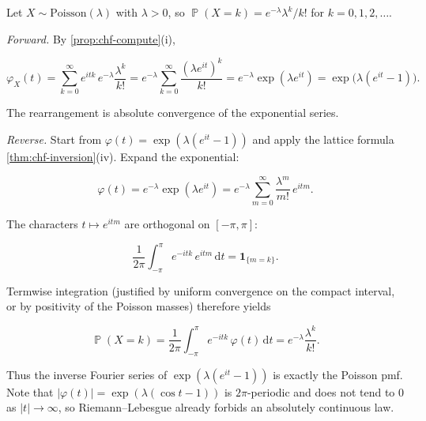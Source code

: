 \documentclass[11pt,a4paper]{article}
\DeclareMathOperator{\Pbb}{\mathbb{P}}
\begin{document}
\begin{example}
\label{ex:chf-poisson}
Let \(X\sim\mathrm{Poisson}(\lambda)\) with \(\lambda>0\), so \(\Pbb(X=k)=e^{-\lambda}\lambda^{k}/k!\) for \(k=0,1,2,\dots\).

\emph{Forward.} By \cref{prop:chf-compute}(i),

\[
\varphi_{X}(t)
=
\sum_{k=0}^{\infty} e^{itk}\,e^{-\lambda}\frac{\lambda^{k}}{k!}
=
e^{-\lambda}
\sum_{k=0}^{\infty} \frac{(\lambda e^{it})^{k}}{k!}
=
e^{-\lambda}\exp(\lambda e^{it})
=
\exp\bigl(\lambda(e^{it}-1)\bigr).
\]

The rearrangement is absolute convergence of the exponential series.

\emph{Reverse.} Start from \(\varphi(t)=\exp(\lambda(e^{it}-1))\) and apply the lattice formula \cref{thm:chf-inversion}(iv). Expand the exponential:

\[
\varphi(t)
=
e^{-\lambda}\exp(\lambda e^{it})
=
e^{-\lambda}
\sum_{m=0}^{\infty} \frac{\lambda^{m}}{m!}\,e^{itm}.
\]

The characters \(t\mapsto e^{itm}\) are orthogonal on \([-\pi,\pi]\):

\[
\frac{1}{2\pi}
\int_{-\pi}^{\pi} e^{-itk}\,e^{itm}\,\mathrm{d}t
=
\mathbf{1}_{\{m=k\}}.
\]

Termwise integration (justified by uniform convergence on the compact interval, or by positivity of the Poisson masses) therefore yields

\[
\Pbb(X=k)
=
\frac{1}{2\pi}
\int_{-\pi}^{\pi} e^{-itk}\,\varphi(t)\,\mathrm{d}t
=
e^{-\lambda}\frac{\lambda^{k}}{k!}.
\]

Thus the inverse Fourier series of \(\exp(\lambda(e^{it}-1))\) is exactly the Poisson pmf. Note that \(|\varphi(t)|=\exp(\lambda(\cos t-1))\) is \(2\pi\)-periodic and does not tend to \(0\) as \(|t|\to\infty\), so Riemann--Lebesgue already forbids an absolutely continuous law.
\end{example}
\end{document}
